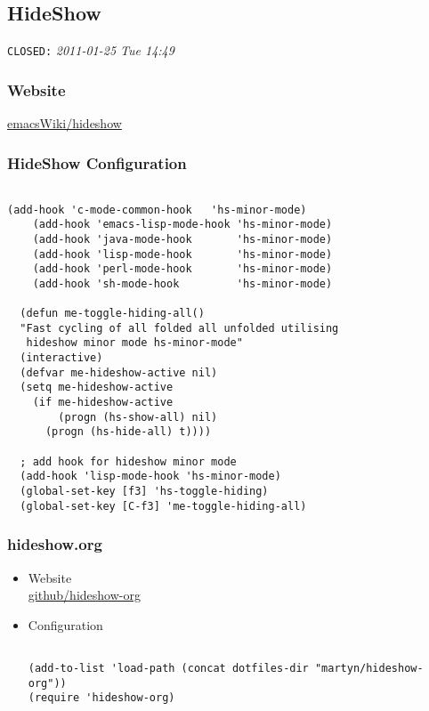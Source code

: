 \documentclass[colorlinks=true,urlcolor=blue,listings-sv]{article}
\begin{document}
\subsection{HideShow}
\label{sec-1-40}

   \texttt{CLOSED:} \textit{2011-01-25 Tue 14:49}
\subsubsection{Website}
\label{sec-1-40-1}


\href{http://www.emacswiki.org/emacs/HideShow}{emacsWiki/hideshow}
\subsubsection{HideShow Configuration}
\label{sec-1-40-2}



\lstset{language=Lisp}
\begin{lstlisting}

(add-hook 'c-mode-common-hook   'hs-minor-mode)
    (add-hook 'emacs-lisp-mode-hook 'hs-minor-mode)
    (add-hook 'java-mode-hook       'hs-minor-mode)
    (add-hook 'lisp-mode-hook       'hs-minor-mode)
    (add-hook 'perl-mode-hook       'hs-minor-mode)
    (add-hook 'sh-mode-hook         'hs-minor-mode)

  (defun me-toggle-hiding-all()
  "Fast cycling of all folded all unfolded utilising 
   hideshow minor mode hs-minor-mode"
  (interactive)
  (defvar me-hideshow-active nil)
  (setq me-hideshow-active
    (if me-hideshow-active 
        (progn (hs-show-all) nil)
      (progn (hs-hide-all) t))))

  ; add hook for hideshow minor mode
  (add-hook 'lisp-mode-hook 'hs-minor-mode)
  (global-set-key [f3] 'hs-toggle-hiding)
  (global-set-key [C-f3] 'me-toggle-hiding-all)
\end{lstlisting}
\subsubsection{hideshow.org}
\label{sec-1-40-3}
\begin{itemize}

\item Website\\
\label{sec-1-40-3-1}%
\href{https://github.com/secelis/hideshow-org}{github/hideshow-org}


\item Configuration\\
\label{sec-1-40-3-2}%
\lstset{language=Lisp}
\begin{lstlisting}

(add-to-list 'load-path (concat dotfiles-dir "martyn/hideshow-org"))
(require 'hideshow-org)
\end{lstlisting}

\end{itemize} %
\end{document}
